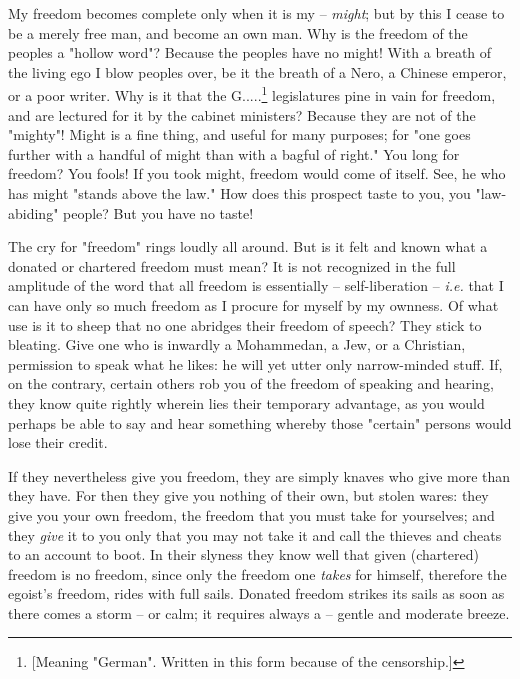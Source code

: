 \documentclass[a4paper]{book}
\begin{document}
My freedom becomes complete only when it is my -- \textit{might}; but by this 
I cease to be a merely free man, and become an own man. Why is the freedom of 
the peoples a "{}hollow word"{}? Because the peoples have no might! With a 
breath of the living ego I blow peoples over, be it the breath of a Nero, a 
Chinese emperor, or a poor writer. Why is it that the G.....\footnote{[Meaning 
"{}German"{}. Written in this form because of the censorship.]} legislatures 
pine in vain for freedom, and are lectured for it by the cabinet ministers? 
Because they are not of the "{}mighty"{}! Might is a fine thing, and useful 
for many purposes; for "{}one goes further with a handful of might than with a 
bagful of right."{} You long for freedom? You fools! If you took might, 
freedom would come of itself. See, he who has might "{}stands above the 
law."{} How does this prospect taste to you, you "{}law-abiding"{} people? But 
you have no taste!

The cry for "{}freedom"{} rings loudly all around. But is it felt and known 
what a donated or chartered freedom must mean? It is not recognized in the 
full amplitude of the word that all freedom is essentially -- self-liberation 
-- \textit{i.e.} that I can have only so much freedom as I procure for myself 
by my ownness. Of what use is it to sheep that no one abridges their freedom 
of speech? They stick to bleating. Give one who is inwardly a Mohammedan, a 
Jew, or a Christian, permission to speak what he likes: he will yet utter only 
narrow-minded stuff. If, on the contrary, certain others rob you of the 
freedom of speaking and hearing, they know quite rightly wherein lies their 
temporary advantage, as you would perhaps be able to say and hear something 
whereby those "{}certain"{} persons would lose their credit.

If they nevertheless give you freedom, they are simply knaves who give more 
than they have. For then they give you nothing of their own, but stolen wares: 
they give you your own freedom, the freedom that you must take for yourselves; 
and they \textit{give} it to you only that you may not take it and call the 
thieves and cheats to an account to boot. In their slyness they know well that 
given (chartered) freedom is no freedom, since only the freedom one 
\textit{takes} for himself, therefore the egoist's freedom, rides with full 
sails. Donated freedom strikes its sails as soon as there comes a storm -- or 
calm; it requires always a -- gentle and moderate breeze.
\end{document}
